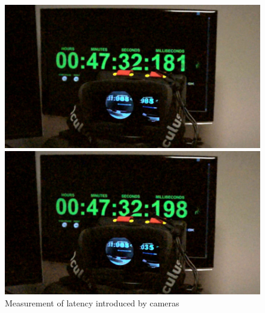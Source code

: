 \documentclass[conference]{acmsiggraph}
\begin{document}


\begin{figure}[tp!]
	\centering
	\begin{minipage}[t]{\linewidth}
		\centering
		\includegraphics[width=\linewidth]{images/00000MTS_Still001.jpg}
	\end{minipage}
	\begin{minipage}[t]{\linewidth}
		\centering
		\includegraphics[width=\linewidth]{images/00000MTS_Still002.jpg}
	\end{minipage}
	\caption{Measurement of latency introduced by cameras} 
		\label{latency}
\end{figure}
\end{document}
